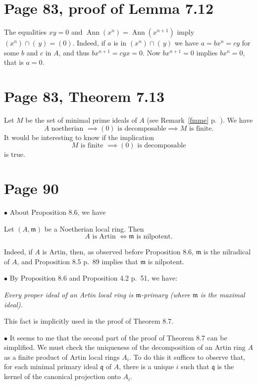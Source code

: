 \documentclass[12pt]{article}
\newcommand{\oo}{\operatorname}
\newcommand{\mf}{\mathfrak}
\newcommand{\bu}{\bullet}
\begin{document}
\section{Page 83, proof of Lemma 7.12}%

The equalities $xy=0$ and $\oo{Ann}(x^n)=\oo{Ann}(x^{n+1})$ imply $(x^n)\cap(\,y)=(0)$. Indeed, if $a$ is in $(x^n)\cap(\,y)$ we have $a=bx^n=cy$ for some $b$ and $c$ in $A$, and thus $bx^{n+1}=cyx=0$. Now $bx^{n+1}=0$ implies $bx^n=0$, that is $a=0$. 

\section{Page 83, Theorem 7.13}%

Let $M$ be the set of minimal prime ideals of $A$ (see Remark~\ref{fmme} p.~\pageref{fmme}). We have 
$$
A\text{ noetherian }\implies(0)\text{ is decomposable}\implies M\text{ is finite.}
$$ 
It would be interesting to know if the implication
$$
M\text{ is finite }\implies(0)\text{ is decomposable}
$$ 
is true.

\section{Page 90}%

$\bu$ About Proposition 8.6, we have 

Let $(A,\mf m)$ be a Noetherian local ring. Then
\begin{equation}\label{86}
A\text{ is Artin $\iff\mf m$ is nilpotent.}
\end{equation}

Indeed, if $A$ is Artin, then, as observed before Proposition 8.6, $\mf m$ is the nilradical of $A$, and Proposition 8.5 p.~89 implies that $\mf m$ is nilpotent. 

$\bu$ By Proposition 8.6 and Proposition 4.2 p.~51, we have:

\emph{Every proper ideal of an Artin local ring is $\mf m$-primary (where $\mf m$ is the maximal ideal).} 

This fact is implicitly used in the proof of Theorem 8.7.

$\bu$ It seems to me that the second part of the proof of Theorem 8.7 can be simplified. We must check the uniqueness of the decomposition of an Artin ring $A$ as a finite product of Artin local rings $A_i$. To do this it suffices to observe that, for each minimal primary ideal $\mathfrak q$ of $A$, there is a unique $i$ such that $\mathfrak q$ is the kernel of the canonical projection onto $A_i$.
\end{document}
